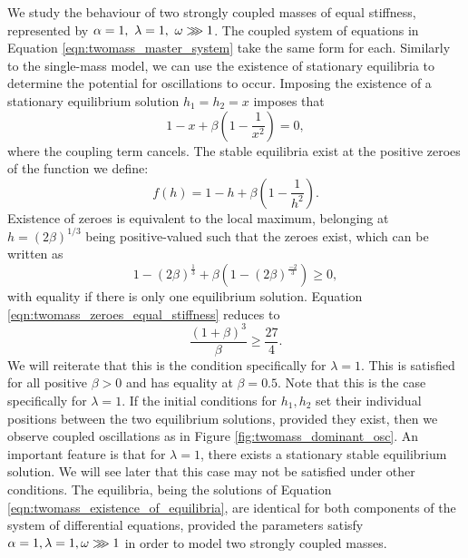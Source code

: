We study the behaviour of two strongly coupled masses of equal stiffness, represented by \( \alpha = 1,~\lambda = 1,~\omega \gggtr 1\).
The coupled system of equations in Equation \ref{eqn:twomass_master_system} take the same form for each.
Similarly to the single-mass model, we can use the existence of stationary equilibria to determine the potential for oscillations to occur.
Imposing the existence of a stationary equilibrium solution \(h_1 = h_2 = x\) imposes that
\begin{equation}
    1 - x + \beta\left(
        1 - \frac{1}{x^2}
    \right) = 0,
\end{equation}
where the coupling term cancels.
The stable equilibria exist at the positive zeroes of the function we define:
\begin{equation}
    f(h) = 1 - h + \beta \left( 1 - \frac{1}{h^2} \right).
    \label{eqn:twomass_existence_of_equilibria}
\end{equation}
Existence of zeroes is equivalent to the local maximum, belonging at \(h = \left( 2\beta \right)^{1/3}\) being positive-valued such that the zeroes exist,
which can be written as
\begin{equation}
    1 - \left(2\beta\right)^\frac{1}{3} + \beta\left( 1 - (2\beta)^\frac{-2}{3} \right) \ge 0,
    \label{eqn:twomass_zeroes_equal_stiffness}
\end{equation}
with equality if there is only one equilibrium solution.
Equation \ref{eqn:twomass_zeroes_equal_stiffness} reduces to
\begin{equation}
    \frac{(1+\beta)^3}{\beta} \ge \frac{27}{4}.
\end{equation}
We will reiterate that this is the condition specifically for $\lambda=1$.
This is satisfied for all positive $\beta>0$ and has equality at $\beta = 0.5$.
Note that this is the case specifically for $\lambda = 1$.
If the initial conditions for \(h_1, h_2\) set their individual positions between the two equilibrium solutions,
provided they exist,
then we observe coupled oscillations as in Figure \ref{fig:twomass_dominant_osc}.
An important feature is that for \(\lambda = 1\), there exists a stationary stable equilibrium solution.
We will see later that this case may not be satisfied under other conditions. %
The equilibria, being the solutions of Equation \ref{eqn:twomass_existence_of_equilibria}, are identical for both components of the system of differential equations,
provided the parameters satisfy \(\alpha = 1, \lambda = 1, \omega \gggtr 1\) in order to model two strongly coupled masses.
